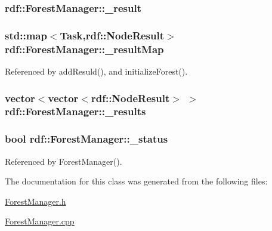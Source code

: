 \subsubsection[{\texorpdfstring{\+\_\+result}{_result}}]{ rdf\+::\+Forest\+Manager\+::\+\_\+result\hspace{0.3cm}{\ttfamily [private]}}\hypertarget{classrdf_1_1ForestManager_ae2ba9a9f403d88f6343cf374d69f8a17}{}\label{classrdf_1_1ForestManager_ae2ba9a9f403d88f6343cf374d69f8a17}
\subsubsection[{\texorpdfstring{\+\_\+result\+Map}{_resultMap}}]{\setlength{\rightskip}{0pt plus 5cm}std\+::map$<${\bf Task},{\bf rdf\+::\+Node\+Result}$>$ rdf\+::\+Forest\+Manager\+::\+\_\+result\+Map\hspace{0.3cm}{\ttfamily [private]}}\hypertarget{classrdf_1_1ForestManager_ad764e01a338ea42ad8b2eaf360971875}{}\label{classrdf_1_1ForestManager_ad764e01a338ea42ad8b2eaf360971875}


Referenced by add\+Resuld(), and initialize\+Forest().

\subsubsection[{\texorpdfstring{\+\_\+results}{_results}}]{\setlength{\rightskip}{0pt plus 5cm}vector$<$vector$<${\bf rdf\+::\+Node\+Result}$>$ $>$ rdf\+::\+Forest\+Manager\+::\+\_\+results\hspace{0.3cm}{\ttfamily [private]}}\hypertarget{classrdf_1_1ForestManager_a818d29de52bed7f09084c71d687ddd4f}{}\label{classrdf_1_1ForestManager_a818d29de52bed7f09084c71d687ddd4f}
\subsubsection[{\texorpdfstring{\+\_\+status}{_status}}]{\setlength{\rightskip}{0pt plus 5cm}bool rdf\+::\+Forest\+Manager\+::\+\_\+status\hspace{0.3cm}{\ttfamily [private]}}\hypertarget{classrdf_1_1ForestManager_a8aa48a6543d83bf43be3b0bc8a8ab253}{}\label{classrdf_1_1ForestManager_a8aa48a6543d83bf43be3b0bc8a8ab253}


Referenced by Forest\+Manager().



The documentation for this class was generated from the following files\+:\begin{DoxyCompactItemize}
\item 
\hyperlink{ForestManager_8h}{Forest\+Manager.\+h}\item 
\hyperlink{ForestManager_8cpp}{Forest\+Manager.\+cpp}\end{DoxyCompactItemize}
